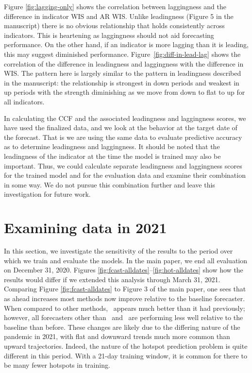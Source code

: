 Figure \ref{fig:lagging-only} shows the correlation between laggingness and the
difference in indicator WIS and AR WIS. Unlike leadingness (Figure 5 in the
manuscript) there is no obvious relationship that holds consistently
across indicators. This is heartening as laggingness
should not aid forecasting performance. On the other hand, if an indicator is
more lagging than it is leading, this may suggest diminished performance.
Figure~\ref{fig:diff-in-lead-lag} shows the correlation of the difference in
leadingness and laggingness with the difference in WIS. The pattern here is
largely similar to the pattern in leadingness described in the manuscript: the
relationship is strongest in down periods and weakest in up periods with the
strength diminishing as we move from down to flat to up for all indicators.

In calculating the CCF and the associated leadingness and laggingness scores, we
have used the finalized data, and we look at the behavior at the 
target date of the forecast. That is we are using the same data to
evaluate predictive accuracy as to determine
leadingness and laggingness. It should be noted that the leadingness of the
indicator at the time the model is trained may also be important. Thus, we could
calculate separate leadingness and laggingness scores for the trained model and
for the evaluation data and examine their combination in some way. We do not
pursue this combination further and leave this investigation for future work.





\section{Examining data in 2021}

In this section, we investigate the sensitivity of the results to the
period over which we train and evaluate the models.  In the main
paper, we end all evaluation on December 31, 2020.  Figures
\ref{fig:fcast-alldates}--\ref{fig:hot-alldates} show how the
results would differ if we extended this analysis through March
  31, 2021. Comparing Figure \ref{fig:fcast-alldates} to Figure 3 of
the main paper, one sees that as ahead increases most methods now improve
relative to the baseline forecaster. When compared to other methods, 
\chngcli~appears much better than
it had previously; however, all forecasters other than \chngcov~and
\dv~are performing less well relative to the baseline than before.
These changes are likely due to the differing nature of the pandemic
in 2021, with flat and downward trends much more common than upward
trajectories.  Indeed, the nature of the hotspot prediction problem is
quite different in this period.  With a 21-day training window, it is
common for there to be many fewer hotspots in training.




